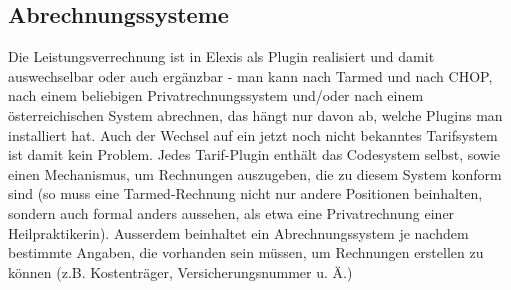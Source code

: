 \documentclass[a4paper]{scrartcl}
\begin{document}
\subsection{Abrechnungssysteme}
\label{Abrechnungssysteme}
Die Leistungsverrechnung ist in Elexis als Plugin realisiert und damit auswechselbar oder auch ergänzbar - man kann nach Tarmed und nach CHOP, nach einem beliebigen Privatrechnungssystem und/oder nach einem österreichischen System abrechnen, das hängt nur davon ab, welche Plugins man installiert hat. Auch der Wechsel auf ein jetzt noch nicht bekanntes Tarifsystem ist damit kein Problem. Jedes Tarif-Plugin enthält das Codesystem selbst, sowie einen Mechanismus, um Rechnungen auszugeben, die zu diesem System konform sind (so muss eine Tarmed-Rechnung nicht nur andere Positionen beinhalten, sondern auch formal anders aussehen, als etwa eine Privatrechnung einer Heilpraktikerin). Ausserdem beinhaltet ein Abrechnungssystem je nachdem bestimmte Angaben, die vorhanden sein müssen, um Rechnungen erstellen zu können (z.B. Kostenträger, Versicherungsnummer u. Ä.)


\medskip
\end{document}
